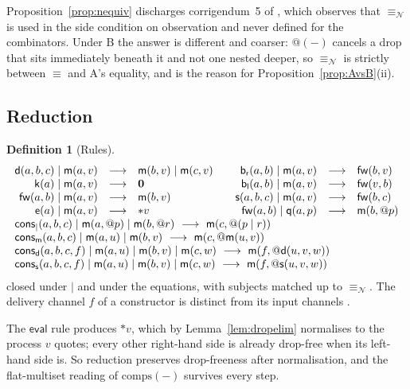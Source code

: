 \documentclass[11pt]{article}
\makeatletter
\theoremstyle{plain}
\theoremstyle{definition}
\newtheorem{definition}[theorem]{Definition}
\theoremstyle{remark}
\newcommand{\quo}[1]{@#1}
\newcommand{\drp}[1]{{*}#1}
\newcommand{\nil}{\mathbf{0}}
\newcommand{\nequiv}{\equiv_{\mathcal{N}}}
\newcommand{\mm}{\mathsf{m}}
\newcommand{\dd}{\mathsf{d}}
\newcommand{\kk}{\mathsf{k}}
\newcommand{\fw}{\mathsf{fw}}
\newcommand{\bl}{\mathsf{b}_{\mathsf{l}}}
\newcommand{\br}{\mathsf{b}_{\mathsf{r}}}
\newcommand{\sy}{\mathsf{s}}
\newcommand{\ev}{\mathsf{e}}
\newcommand{\qq}{\mathsf{q}}
\newcommand{\cons}{\mathsf{cons}}
\newcommand{\consp}{\cons_{\mid}}
\newcommand{\consm}{\cons_{\mm}}
\newcommand{\consd}{\cons_{\dd}}
\newcommand{\conss}{\cons_{\sy}}
\newcommand{\red}{\longrightarrow}
\newcommand{\scong}{\equiv}
\newcommand{\comps}[1]{\mathrm{comps}(#1)}
\makeatother
\begin{document}
Proposition~\ref{prop:nequiv} discharges corrigendum~5 of
\cite[\S11]{rhocomb3}, which observes that $\nequiv$ is used in the side
condition on observation and never defined for the combinators. Under B the
answer is different and coarser: $\quo{(-)}$ cancels a drop that sits
immediately beneath it and not one nested deeper, so $\nequiv$ is strictly
between $\scong$ and A's equality, and is the reason for
Proposition~\ref{prop:AvsB}(ii).

\subsection{Reduction}

\begin{definition}[Rules]
\label{def:red}
\[
\begin{array}{rcl@{\qquad}rcl}
  \dd(a,b,c) \mid \mm(a,v) &\red& \mm(b,v) \mid \mm(c,v)
    & \br(a,b) \mid \mm(a,v) &\red& \fw(b,v)\\
  \kk(a) \mid \mm(a,v) &\red& \nil
    & \bl(a,b) \mid \mm(a,v) &\red& \fw(v,b)\\
  \fw(a,b) \mid \mm(a,v) &\red& \mm(b,v)
    & \sy(a,b,c) \mid \mm(a,v) &\red& \fw(b,c)\\
  \ev(a) \mid \mm(a,v) &\red& \drp{v}
    & \fw(a,b) \mid \qq(a,p) &\red& \mm(b,\quo{p})\\
  \multicolumn{6}{l}{\consp(a,b,c) \mid \mm(a,\quo{p}) \mid \mm(b,\quo{r})
     \ \red\ \mm(c,\quo{(p \mid r)})}\\
  \multicolumn{6}{l}{\consm(a,b,c) \mid \mm(a,u) \mid \mm(b,v)
     \ \red\ \mm(c,\quo{\mm(u,v)})}\\
  \multicolumn{6}{l}{\consd(a,b,c,f) \mid \mm(a,u) \mid \mm(b,v)
     \mid \mm(c,w) \ \red\ \mm(f,\quo{\dd(u,v,w)})}\\
  \multicolumn{6}{l}{\conss(a,b,c,f) \mid \mm(a,u) \mid \mm(b,v)
     \mid \mm(c,w) \ \red\ \mm(f,\quo{\sy(u,v,w)})}
\end{array}
\]
closed under $\mid$ and under the equations, with subjects matched up to
$\nequiv$. The delivery channel $f$ of a constructor is distinct from its
input channels \cite[Rem.~3.4]{rhocomb3}.
\end{definition}

The $\mathsf{eval}$ rule produces $\drp{v}$, which by Lemma~\ref{lem:dropelim}
normalises to the process $v$ quotes; every other right-hand side is already
drop-free when its left-hand side is. So reduction preserves drop-freeness
after normalisation, and the flat-multiset reading of $\comps{-}$ survives
every step.
\end{document}
